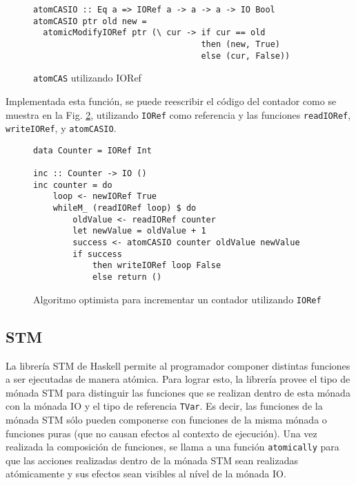 \begin{figure}[!h]
\begin{verbatim}
atomCASIO :: Eq a => IORef a -> a -> a -> IO Bool
atomCASIO ptr old new =
  atomicModifyIORef ptr (\ cur -> if cur == old
                                  then (new, True)
                                  else (cur, False))
\end{verbatim}
\caption{\texttt{atomCAS} utilizando IORef}
\label{fig:atomcasio}
\end{figure}

Implementada esta función, se puede reescribir el código del contador como se muestra en la Fig. \ref{fig:lockfree-counter-example-ioref}, utilizando \texttt{IORef} como referencia y las funciones \texttt{readIORef}, \texttt{writeIORef}, y \texttt{atomCASIO}.

\begin{figure}[!h]
\begin{verbatim}
data Counter = IORef Int

inc :: Counter -> IO ()
inc counter = do
    loop <- newIORef True
    whileM_ (readIORef loop) $ do
        oldValue <- readIORef counter
        let newValue = oldValue + 1
        success <- atomCASIO counter oldValue newValue
        if success
            then writeIORef loop False
            else return ()
\end{verbatim}
\caption{Algoritmo optimista para incrementar un contador utilizando \texttt{IORef}}
\label{fig:lockfree-counter-example-ioref}
\end{figure}

\subsection{STM}\label{sub:stm}
La librería STM de Haskell permite al programador componer distintas funciones a ser ejecutadas de manera atómica.
Para lograr esto, la librería provee el tipo de mónada STM para distinguir las funciones que se realizan dentro de esta mónada con la mónada IO y el tipo de referencia \texttt{TVar}.
Es decir, las funciones de la mónada STM sólo pueden componerse con funciones de la misma mónada o funciones puras (que no causan efectos al contexto de ejecución). Una vez realizada la composición de funciones, se llama a una función \texttt{atomically} para que las acciones realizadas dentro de la mónada STM sean realizadas atómicamente y sus efectos sean visibles al nível de la mónada IO.

